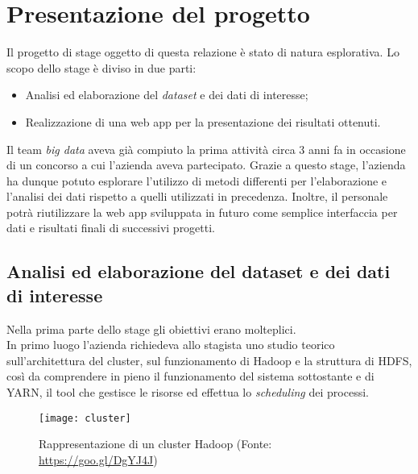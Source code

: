 
\section{Presentazione del progetto}
Il progetto di stage oggetto di questa relazione è stato di natura esplorativa. Lo scopo dello stage è diviso in due parti:
\begin{itemize}
	\item Analisi ed elaborazione del \textit{dataset} e dei dati di interesse;
	\item Realizzazione di una \gls{web app} per la presentazione dei risultati ottenuti.
\end{itemize}
Il team \textit{big data} aveva già compiuto la prima attività circa 3 anni fa in occasione di un concorso a cui l'azienda aveva partecipato.
Grazie a questo stage, l'azienda ha dunque potuto esplorare l'utilizzo di metodi differenti per l'elaborazione e l'analisi dei dati rispetto a quelli utilizzati in precedenza. 
Inoltre, il personale potrà riutilizzare la \gls{web app} sviluppata in futuro come semplice interfaccia per dati e risultati finali di successivi progetti.
\subsection{Analisi ed elaborazione del dataset e dei dati di interesse}
Nella prima parte dello stage gli obiettivi erano molteplici. \\
In primo luogo l'azienda richiedeva allo stagista uno studio teorico sull'architettura del \gls{cluster}, sul funzionamento di Hadoop e la struttura di \gls{HDFS}, così da comprendere in pieno il funzionamento del sistema sottostante e di YARN, il tool che gestisce le risorse ed effettua lo \textit{scheduling} dei processi.
\clearpage
\begin{figure}[!h] 
	\centering 
	\texttt{[image: cluster]}
	\caption{Rappresentazione di un cluster Hadoop (Fonte: \href{https://goo.gl/DgYJ4J}{https://goo.gl/DgYJ4J})}
\end{figure}

